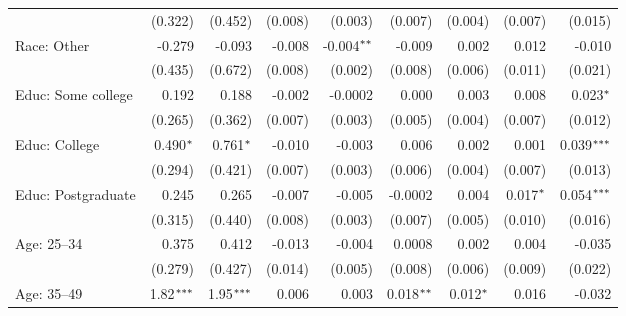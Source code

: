 \documentclass[12pt, letterpaper]{article}
\begin{document}
\begin{table}[!ht]
\begin{adjustbox}{max width=\textwidth}
\begin{tabular}{@{\hspace{0\tabcolsep}}l*{8}{D{.}{.}{-1}}@{\hspace{0\tabcolsep}}}
                              & (0.322)       & (0.452)       & (0.008)       & (0.003)       & (0.007)                & (0.004)                & (0.007)       & (0.015)\\   
      Race: Other             & -0.279        & -0.093        & -0.008        & -0.004$\sym{**}$ & -0.009                 & 0.002                  & 0.012         & -0.010\\   
                              & (0.435)       & (0.672)       & (0.008)       & (0.002)       & (0.008)                & (0.006)                & (0.011)       & (0.021)\\   
      Educ: Some college      & 0.192         & 0.188         & -0.002        & -0.0002       & 0.000   & 0.003                  & 0.008         & 0.023$\sym{*}$\\   
                              & (0.265)       & (0.362)       & (0.007)       & (0.003)       & (0.005)                & (0.004)                & (0.007)       & (0.012)\\   
      Educ: College           & 0.490$\sym{*}$   & 0.761$\sym{*}$   & -0.010        & -0.003        & 0.006                  & 0.002                  & 0.001         & 0.039$\sym{***}$\\   
                              & (0.294)       & (0.421)       & (0.007)       & (0.003)       & (0.006)                & (0.004)                & (0.007)       & (0.013)\\   
      Educ: Postgraduate      & 0.245         & 0.265         & -0.007        & -0.005        & -0.0002                & 0.004                  & 0.017$\sym{*}$   & 0.054$\sym{***}$\\   
                              & (0.315)       & (0.440)       & (0.008)       & (0.003)       & (0.007)                & (0.005)                & (0.010)       & (0.016)\\   
      Age: 25--34             & 0.375         & 0.412         & -0.013        & -0.004        & 0.0008                 & 0.002                  & 0.004         & -0.035\\   
                              & (0.279)       & (0.427)       & (0.014)       & (0.005)       & (0.008)                & (0.006)                & (0.009)       & (0.022)\\   
      Age: 35--49             & 1.82$\sym{***}$  & 1.95$\sym{***}$  & 0.006         & 0.003         & 0.018$\sym{**}$           & 0.012$\sym{*}$            & 0.016         & -0.032\\   

\end{tabular}
\end{adjustbox}
\end{table}
\end{document}
